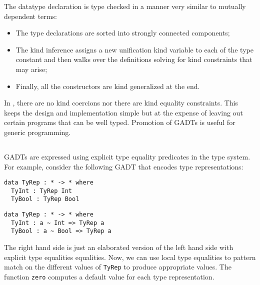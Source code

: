 \documentclass[manuscript,screen,nonacm]{acmart}
\begin{document}
The datatype declaration is type checked in a manner very similar to mutually dependent terms:
\begin{itemize}
\item The type declarations are sorted into strongly connected components;
\item The kind inference assigns a new unification kind variable to each of the type constant and then walks over the definitions solving for kind constraints that may arise;
\item Finally, all the constructors are kind generalized at the end.
\end{itemize}

In \SFP, there are no kind coercions nor there are kind equality constraints. This keeps the design and implementation simple but at the expense of leaving out certain programs that can be well typed. Promotion of GADTs is useful for generic programming.

\subsection{\SFK}\label{sec:sfk} %
GADTs are expressed using explicit type equality predicates in the type system. For example, consider the following GADT that encodes type representations:

\begin{minipage}[ht]{0.5\linewidth}
\begin{lstlisting}
data TyRep : * -> * where
  TyInt : TyRep Int
  TyBool : TyRep Bool
\end{lstlisting}
\end{minipage}%
\begin{minipage}[ht]{0.5\linewidth}
\begin{lstlisting}
data TyRep : * -> * where
  TyInt : a ~ Int => TyRep a
  TyBool : a ~ Bool => TyRep a
\end{lstlisting}
\end{minipage}

The right hand side is just an elaborated version of the left hand side with explicit type equalities equalities.
Now, we can use local type equalities to pattern match on the different values of \lstinline{TyRep} to produce appropriate values. The function \lstinline{zero} computes a default value for each type representation.
\end{document}
